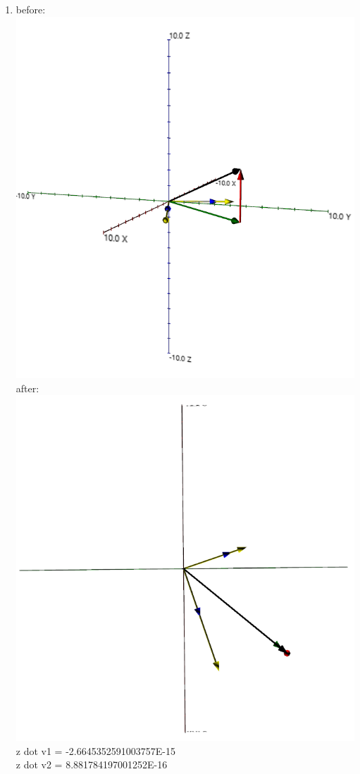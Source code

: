 \documentclass{article}
\begin{document}
\begin{enumerate}
\item before:\\
\includegraphics[scale=0.4]{module7_exercise22_a}\\
after:\\
\includegraphics[scale=0.4]{module7_exercise22_b}
	z dot v1 = -2.6645352591003757E-15\\
	z dot v2 = 8.881784197001252E-16


\end{enumerate}
\end{document}
